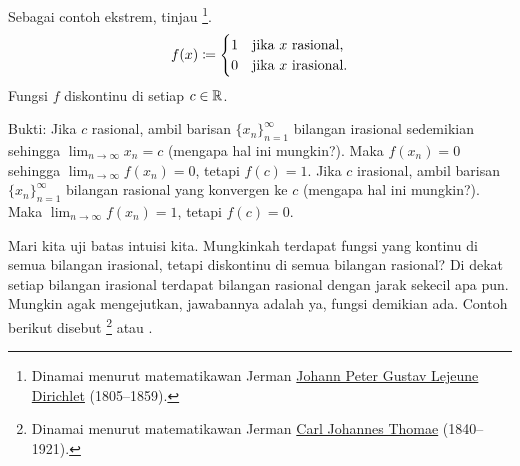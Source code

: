 \begin{example}
Sebagai contoh ekstrem, tinjau
\emph{}\footnote{Dinamai menurut matematikawan
Jerman
\href{https://en.wikipedia.org/wiki/Peter_Gustav_Lejeune_Dirichlet}{Johann Peter Gustav Lejeune
Dirichlet}
(1805--1859).}.
\begin{equation*}
f(x) \coloneqq
\begin{cases}
1 & \text{jika } x \text{ rasional,} \\
0 & \text{jika } x \text{ irasional.}
\end{cases}
\avoidbreak
\end{equation*}
Fungsi $f$ diskontinu di setiap $c \in {\mathbb{R}}$.

Bukti:
Jika $c$ rasional, ambil barisan $\{ x_n \}_{n=1}^\infty$
bilangan irasional sedemikian sehingga $\lim_{n\to\infty} x_n = c$ (mengapa hal ini mungkin?).  Maka $f(x_n) = 0$
sehingga $\lim_{n\to\infty} f(x_n) = 0$, tetapi $f(c) = 1$.
Jika $c$ irasional, ambil barisan
$\{ x_n \}_{n=1}^\infty$
bilangan rasional
yang konvergen ke $c$ (mengapa hal ini mungkin?).  Maka $\lim_{n\to\infty} f(x_n) = 1$, tetapi $f(c) = 0$.
\end{example}

Mari kita uji batas intuisi kita.  Mungkinkah
terdapat fungsi yang kontinu di semua bilangan irasional, tetapi
diskontinu di semua bilangan rasional?  Di dekat setiap bilangan irasional terdapat bilangan rasional
dengan jarak sekecil apa pun.  Mungkin agak mengejutkan,
jawabannya adalah ya, fungsi demikian ada.  Contoh berikut disebut
\emph{}\footnote{Dinamai menurut matematikawan
Jerman
\href{https://en.wikipedia.org/wiki/Carl_Johannes_Thomae}{Carl Johannes Thomae}
(1840--1921).} atau
\emph{}.

